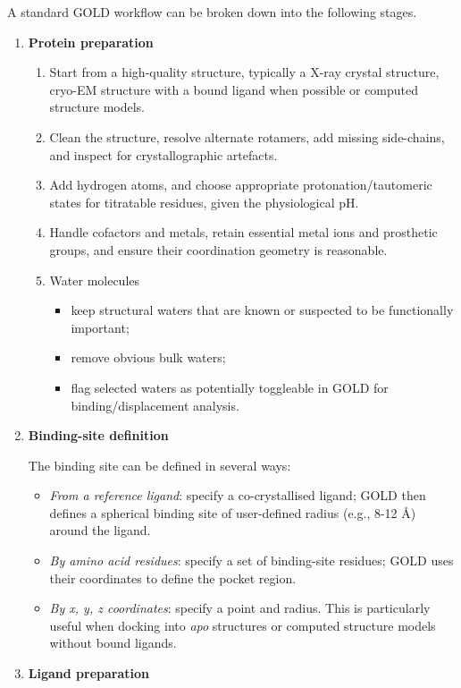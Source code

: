 \documentclass[12pt]{article}
\begin{document}
A standard GOLD workflow can be broken down into the following stages.
\begin{enumerate}
  \item \textbf{Protein preparation}
\begin{enumerate}
    \item Start from a high-quality structure, typically a X-ray crystal structure, cryo-EM structure with a bound ligand when possible or computed structure models.
    \item Clean the structure, resolve alternate rotamers, add missing side-chains, and inspect for crystallographic artefacts.
    \item Add hydrogen atoms, and choose appropriate protonation/tautomeric states for titratable residues, given the physiological pH.
    \item Handle cofactors and metals, retain essential metal ions and prosthetic groups, and ensure their coordination geometry is reasonable.
    \item Water molecules
    \begin{itemize}
        \item keep structural waters that are known or suspected to be functionally important;
        \item remove obvious bulk waters;
        \item flag selected waters as potentially toggleable in GOLD for binding/displacement analysis.
    \end{itemize}
\end{enumerate}

\item \textbf{Binding-site definition}

The binding site can be defined in several ways:
\begin{itemize}
    \item \emph{From a reference ligand}: specify a co-crystallised ligand; GOLD then defines a spherical binding site of user-defined radius (e.g., 8-12 \r{A}) around the ligand.
    \item \emph{By amino acid residues}: specify a set of binding-site residues; GOLD uses their coordinates to define the pocket region.
    \item \emph{By x, y, z coordinates}: specify a point and radius. This is particularly useful when docking into \emph{apo} structures or computed structure models without bound ligands.
\end{itemize}

\item \textbf{Ligand preparation}


\end{enumerate}
\end{document}
